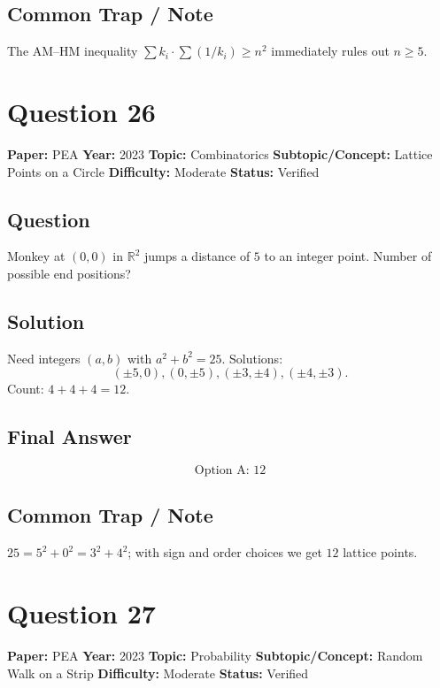 \documentclass[11pt]{article}
\begin{document}
\subsection*{Common Trap / Note}
The AM--HM inequality $\sum k_i\cdot\sum(1/k_i)\ge n^2$ immediately rules out $n\ge 5$.

\medskip

\section*{Question 26}
\textbf{Paper:} PEA \quad \textbf{Year:} 2023 \quad \textbf{Topic:} Combinatorics \quad \textbf{Subtopic/Concept:} Lattice Points on a Circle \quad \textbf{Difficulty:} Moderate \quad \textbf{Status:} Verified

\subsection*{Question}
Monkey at $(0,0)$ in $\mathbb R^2$ jumps a distance of $5$ to an integer point. Number of possible end positions?

\subsection*{Solution}
Need integers $(a,b)$ with $a^2+b^2=25$. Solutions:
\[
(\pm 5,0),(0,\pm 5),(\pm 3,\pm 4),(\pm 4,\pm 3).
\]
Count: $4+4+4=12$.

\subsection*{Final Answer}
\[
\boxed{\text{Option A: } 12}
\]

\subsection*{Common Trap / Note}
$25=5^2+0^2=3^2+4^2$; with sign and order choices we get $12$ lattice points.

\medskip

\section*{Question 27}
\textbf{Paper:} PEA \quad \textbf{Year:} 2023 \quad \textbf{Topic:} Probability \quad \textbf{Subtopic/Concept:} Random Walk on a Strip \quad \textbf{Difficulty:} Moderate \quad \textbf{Status:} Verified
\end{document}
